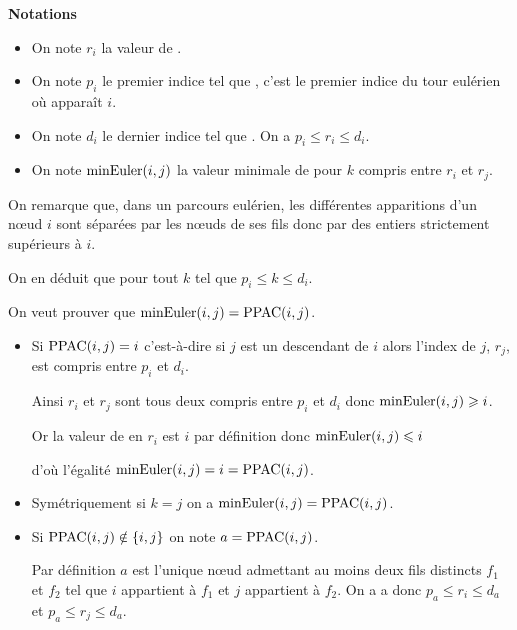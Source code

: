 \begin{Exercise}

{\bf Notations}

\begin{itemize}
  \item On note $r_i$ la valeur de .
  \item On note $p_i$ le premier indice tel que , c'est le premier indice du tour eulérien où apparaît $i$.
  
  \item On note $d_i$ le dernier indice tel que . On a $p_i\le r_i\le d_i$.
  
  \item On note $\hbox{minEuler}(i,j)$ la valeur minimale de  pour $k$ compris entre $r_i$ et $r_j$.
  
\end{itemize} 


\medskip

On remarque que, dans un parcours eulérien, les différentes apparitions d'un nœud $i$ sont séparées par les nœuds de ses fils donc par des entiers strictement supérieurs à $i$. 

On en déduit que  pour tout $k$ tel que $p_i\le k\le d_i$.

\medskip

 On veut prouver que $\hbox{minEuler}(i,j) = \hbox{PPAC}(i,j)$.

\begin{itemize}
\item Si $\hbox{PPAC}(i,j)=i$ c'est-à-dire si $j$ est un descendant de $i$ alors l'index de $j$, $r_j$, est compris entre $p_i$ et $d_i$.

Ainsi $r_i$ et $r_j$ sont tous deux compris entre $p_i$ et $d_i$ donc $\hbox{minEuler}(i,j) \ge i$. 

Or la valeur de  en $r_i$ est $i$ par définition donc $\hbox{minEuler}(i,j) \le i$ 

d'où l'égalité $\hbox{minEuler}(i,j) = i =\hbox{PPAC}(i,j)$.

\item Symétriquement si $k=j$ on a  $\hbox{minEuler}(i,j)  =\hbox{PPAC}(i,j)$.

\item Si $\hbox{PPAC}(i,j)\notin \{i,j\}$ on note $a = \hbox{PPAC}(i,j)$.

Par définition $a$ est l'unique nœud admettant au moins deux fils distincts $f_1$ et $f_2$ tel que $i$ appartient à $f_1$ et $j$ appartient à $f_2$. On a a donc $p_a \le r_i\le d_a$ et $p_a \le r_j\le d_a$.


\end{itemize}
\end{Exercise}
